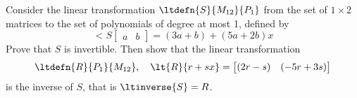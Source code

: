 Consider the linear transformation $\ltdefn{S}{M_{12}}{P_1}$ from the set of $1\times 2$ matrices to the set of polynomials of degree at most 1, defined by 
%
\begin{equation*}
\lt{S}{\begin{bmatrix}a & b\end{bmatrix}}=(3a+b)+(5a+2b)x
\end{equation*}
%
Prove that $S$ is invertible.  Then show that the linear transformation
%
\begin{equation*}
\ltdefn{R}{P_1}{M_{12}},\quad \lt{R}{r+sx}=\begin{bmatrix}(2r-s) & (-5r+3s)\end{bmatrix}
\end{equation*}
%
is the inverse of $S$, that is $\ltinverse{S}=R$.